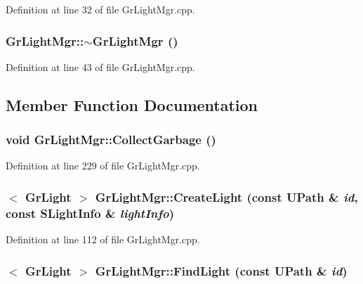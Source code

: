 Definition at line 32 of file GrLightMgr.cpp.\hypertarget{class_gr_light_mgr_61c1067fe1f0e57314c28363fb6a4d8b}{
\subsubsection[{$\sim$GrLightMgr}]{\setlength{\rightskip}{0pt plus 5cm}GrLightMgr::$\sim$GrLightMgr ()}}
\label{class_gr_light_mgr_61c1067fe1f0e57314c28363fb6a4d8b}




Definition at line 43 of file GrLightMgr.cpp.

\subsection{Member Function Documentation}
\hypertarget{class_gr_light_mgr_c2b28fc11940063d19cd95284d373ed3}{
\subsubsection[{CollectGarbage}]{\setlength{\rightskip}{0pt plus 5cm}void GrLightMgr::CollectGarbage ()}}
\label{class_gr_light_mgr_c2b28fc11940063d19cd95284d373ed3}




Definition at line 229 of file GrLightMgr.cpp.\hypertarget{class_gr_light_mgr_c0253a53f0d8c23131ac54a68217231a}{
\subsubsection[{CreateLight}]{$<$ {\bf GrLight} $>$ GrLightMgr::CreateLight (const {\bf UPath} \& {\em id}, \/  const {\bf SLightInfo} \& {\em lightInfo})}}
\label{class_gr_light_mgr_c0253a53f0d8c23131ac54a68217231a}




Definition at line 112 of file GrLightMgr.cpp.\hypertarget{class_gr_light_mgr_8d8c949784428299e9046f856f48cda4}{
\subsubsection[{FindLight}]{$<$ {\bf GrLight} $>$ GrLightMgr::FindLight (const {\bf UPath} \& {\em id})}}
\label{class_gr_light_mgr_8d8c949784428299e9046f856f48cda4}




